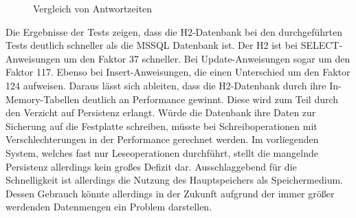 \begin{figure}[htbp]
\centering
{}\hfill
{}\hfill
{}
\caption{Vergleich von Antwortzeiten}
\label{ergebniss_vergleich}
\end{figure}

Die Ergebnisse der Tests zeigen, dass die H2-Datenbank bei den durchgeführten Tests deutlich schneller als die MSSQL Datenbank ist. Der H2 ist bei SELECT-Anweisungen um den Faktor 37 schneller. Bei Update-Anweisungen sogar um den Faktor 117. Ebenso bei Insert-Anweisungen, die einen Unterschied um den Faktor 124 aufweisen. Daraus lässt sich ableiten, dass die H2-Datenbank durch ihre In-Memory-Tabellen deutlich an Performance gewinnt. Diese wird zum Teil durch den Verzicht auf Persistenz erlangt. Würde die Datenbank ihre Daten zur Sicherung auf die Festplatte schreiben, müsste bei Schreiboperationen mit Verschlechterungen in der Performance gerechnet werden. Im vorliegenden System, welches fast nur Leseoperationen durchführt, stellt die mangelnde Persistenz allerdings kein großes Defizit dar. Ausschlaggebend für die Schnelligkeit ist allerdings die Nutzung des Hauptspeichers als Speichermedium. Dessen Gebrauch könnte allerdings in der Zukunft aufgrund der immer größer werdenden Datenmengen ein Problem darstellen.  

